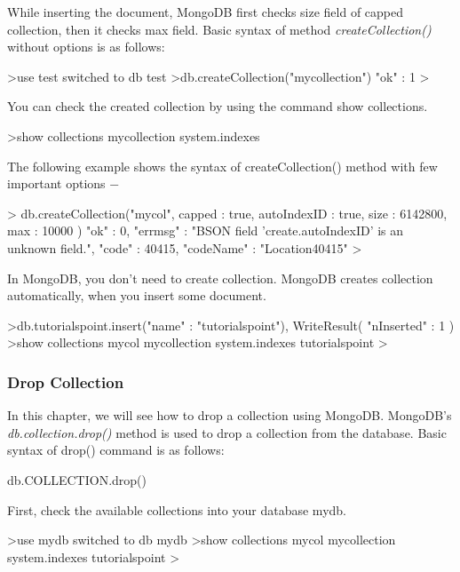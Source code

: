 \documentclass[12pt]{article}
\begin{document}
While inserting the document, MongoDB first checks size field of capped
collection, then it checks max field. Basic syntax of method
\emph{createCollection()} without options is as follows:

\begin{bashcode}
>use test
switched to db test
>db.createCollection("mycollection")
{ "ok" : 1 }
>
\end{bashcode}

You can check the created collection by using the command show collections.

\begin{bashcode}
>show collections
mycollection
system.indexes
\end{bashcode}

The following example shows the syntax of createCollection() method with few important options −

\begin{bashcode}
> db.createCollection("mycol", { capped : true, autoIndexID : true, size : 6142800, max : 10000 } ){
"ok" : 0,
"errmsg" : "BSON field 'create.autoIndexID' is an unknown field.",
"code" : 40415,
"codeName" : "Location40415"
}
>
\end{bashcode}

In MongoDB, you don't need to create collection. MongoDB creates
collection automatically, when you insert some document.

\begin{bashcode}
>db.tutorialspoint.insert({"name" : "tutorialspoint"}),
WriteResult({ "nInserted" : 1 })
>show collections
mycol
mycollection
system.indexes
tutorialspoint
>
\end{bashcode}

\subsubsection{Drop Collection}

In this chapter, we will see how to drop a collection using MongoDB.
MongoDB's \emph{db.collection.drop()} method is used to drop a
collection from the database. Basic syntax of drop() command is as
follows:

\begin{bashcode}
db.COLLECTION.drop()
\end{bashcode}

First, check the available collections into your database mydb.

\begin{bashcode}
>use mydb
switched to db mydb
>show collections
mycol
mycollection
system.indexes
tutorialspoint
>
\end{bashcode}
\end{document}
